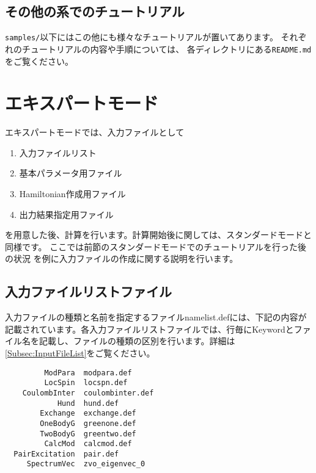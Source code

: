 \subsection{その他の系でのチュートリアル}

\verb|samples/|以下にはこの他にも様々なチュートリアルが置いてあります。
それぞれのチュートリアルの内容や手順については、
各ディレクトリにある\verb|README.md|をご覧ください。

\newpage
\section{エキスパートモード}

エキスパートモードでは、入力ファイルとして
\begin{enumerate}
\item 入力ファイルリスト
\item 基本パラメータ用ファイル
\item Hamiltonian作成用ファイル
\item 出力結果指定用ファイル
\end{enumerate}
を用意した後、計算を行います。計算開始後に関しては、スタンダードモードと同様です。
ここでは前節のスタンダードモードでのチュートリアルを行った後の状況
を例に入力ファイルの作成に関する説明を行います。

\subsection{入力ファイルリストファイル}
入力ファイルの種類と名前を指定するファイルnamelist.defには、下記の内容が記載されています。各入力ファイルリストファイルでは、行毎にKeywordとファイル名を記載し、ファイルの種類の区別を行います。詳細は\ref{Subsec:InputFileList}をご覧ください。
\\
\begin{minipage}{15cm}
\begin{screen}
\begin{verbatim}
         ModPara  modpara.def
         LocSpin  locspn.def
    CoulombInter  coulombinter.def
            Hund  hund.def
        Exchange  exchange.def
        OneBodyG  greenone.def
        TwoBodyG  greentwo.def
         CalcMod  calcmod.def
  PairExcitation  pair.def
     SpectrumVec  zvo_eigenvec_0
\end{verbatim}
\end{screen}
\end{minipage}


